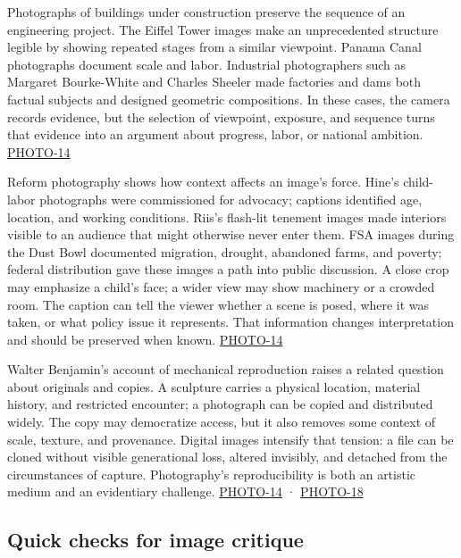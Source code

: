 Photographs of buildings under construction preserve the sequence of an engineering project. The Eiffel Tower images make an unprecedented structure legible by showing repeated stages from a similar viewpoint. Panama Canal photographs document scale and labor. Industrial photographers such as Margaret Bourke-White and Charles Sheeler made factories and dams both factual subjects and designed geometric compositions. In these cases, the camera records evidence, but the selection of viewpoint, exposure, and sequence turns that evidence into an argument about progress, labor, or national ambition. \hyperref[04-visual-computing-ii-ch036-photo-14---photography-session-14]{PHOTO-14}

Reform photography shows how context affects an image's force. Hine's child-labor photographs were commissioned for advocacy; captions identified age, location, and working conditions. Riis's flash-lit tenement images made interiors visible to an audience that might otherwise never enter them. FSA images during the Dust Bowl documented migration, drought, abandoned farms, and poverty; federal distribution gave these images a path into public discussion. A close crop may emphasize a child's face; a wider view may show machinery or a crowded room. The caption can tell the viewer whether a scene is posed, where it was taken, or what policy issue it represents. That information changes interpretation and should be preserved when known. \hyperref[04-visual-computing-ii-ch036-photo-14---photography-session-14]{PHOTO-14}

Walter Benjamin's account of mechanical reproduction raises a related question about originals and copies. A sculpture carries a physical location, material history, and restricted encounter; a photograph can be copied and distributed widely. The copy may democratize access, but it also removes some context of scale, texture, and provenance. Digital images intensify that tension: a file can be cloned without visible generational loss, altered invisibly, and detached from the circumstances of capture. Photography's reproducibility is both an artistic medium and an evidentiary challenge. \hyperref[04-visual-computing-ii-ch036-photo-14---photography-session-14]{PHOTO-14} · \hyperref[04-visual-computing-ii-ch036-photo-18---photography-session-18]{PHOTO-18}

\subsection{Quick checks for image critique}\label{04-visual-computing-ii-ch034-quick-checks-for-image-critique}

